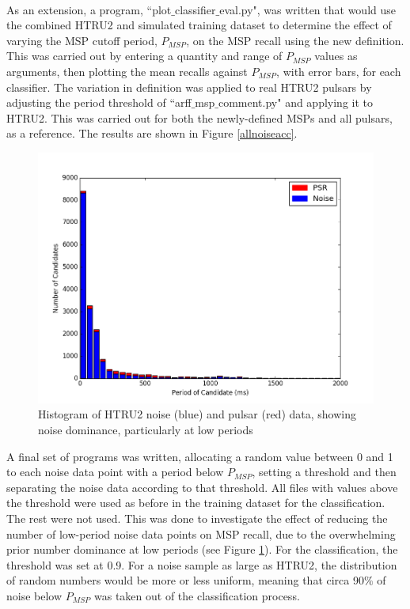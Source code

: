 \documentclass[12pt]{article}
\begin{document}
\paragraph{}
As an extension, a program, ``plot$\_$classifier$\_$eval.py",  was written that would use the combined HTRU2 and simulated training dataset to determine the effect of varying the MSP cutoff period, $P_{MSP}$, on the MSP recall using the new definition. This was carried out by entering a quantity and range of $P_{MSP}$ values as arguments, then plotting the mean recalls against $P_{MSP}$, with error bars, for each classifier. The variation in definition was applied to real HTRU2 pulsars by adjusting the period threshold of ``arff$\_$msp$\_$comment.py" and applying it to HTRU2. This was carried out for both the newly-defined MSPs and all pulsars, as a reference. The results are shown in Figure \ref{allnoiseacc}.

\begin{figure}[h!]
\begin{center}
\includegraphics[scale=0.5]{htru2_period_hist.png}
\caption{Histogram of HTRU2 noise (blue) and pulsar (red) data, showing noise dominance, particularly at low periods}
\label{htru2hist}
\end{center}
\end{figure}

A final set of programs was written, allocating a random value between 0 and 1 to each noise data point with a period below $P_{MSP}$, setting a threshold and then separating the noise data according to that threshold. All files with values above the threshold were used as before in the training dataset for the classification. The rest were not used. This was done to investigate the effect of reducing the number of low-period noise data points on MSP recall, due to the overwhelming prior number dominance at low periods (see Figure \ref{htru2hist}). For the classification, the threshold was set at 0.9. For a noise sample as large as HTRU2, the distribution of random numbers would be more or less uniform, meaning that circa 90$\%$ of noise below $P_{MSP}$ was taken out of the classification process.
\end{document}
